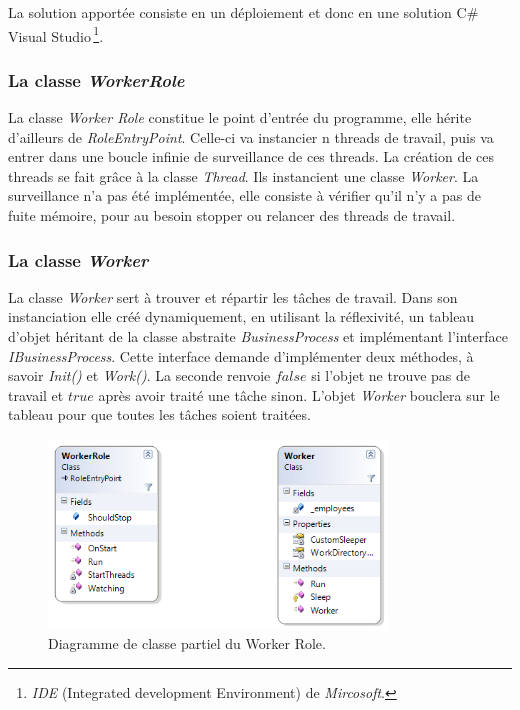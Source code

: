 La solution apportée consiste en un déploiement et donc en une
solution C\# Visual Studio\,\footnote{\textit{IDE} (Integrated development
  Environment) de \textit{Mircosoft}.}.




\subsubsection{La classe \textit{WorkerRole}}
La classe \textit{Worker Role} constitue le point d'entrée du
programme, elle hérite d'ailleurs de \textit{RoleEntryPoint}. Celle-ci
va instancier n threads de travail, puis va entrer dans une boucle
infinie de surveillance de ces threads. La création de ces threads se
fait grâce à la classe \textit{Thread}. Ils instancient une classe
\textit{Worker}. La surveillance n'a pas été implémentée, elle
consiste à vérifier qu'il n'y a pas de fuite mémoire, pour au besoin
stopper ou relancer des threads de travail.


\subsubsection{La classe \textit{Worker}}
La classe \textit{Worker} sert à trouver et répartir les tâches de
travail. Dans son instanciation elle créé dynamiquement, en utilisant
la réflexivité, un tableau d'objet héritant de la classe
abstraite \textit{BusinessProcess} et implémentant l'interface
\textit{IBusinessProcess}. Cette interface demande d'implémenter deux
méthodes, à savoir \textit{Init()} et \textit{Work()}. La seconde
renvoie $false$ si l'objet ne trouve pas de travail et $true$ après
avoir traité une tâche sinon. L'objet \textit{Worker} bouclera sur le
tableau pour que toutes les tâches soient traitées.

\begin{figure}[h!]
  \caption{Diagramme de classe partiel du Worker Role.}
  \centering
    \includegraphics[width=0.8\textwidth]{images/WorkerRole.png}
\end{figure}

